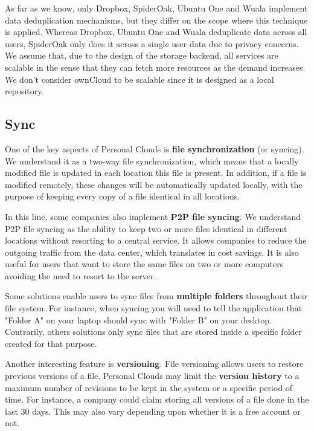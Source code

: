 As far as we know, only Dropbox, SpiderOak, Ubuntu One and Wuala implement data deduplication mechanisms, but they differ on the scope where this technique is applied. Whereas Dropbox, Ubuntu One and Wuala deduplicate data across all users, SpiderOak only does it across a single user data due to privacy concerns. We assume that, due to the design of the storage backend, all services are scalable in the sense that they can fetch more resources as the demand increases. We don't consider ownCloud to be scalable since it is designed as a local repository.

\subsection{Sync}
One of the key aspects of Personal Clouds is \textbf{file synchronization} (or syncing). We understand it as a two-way file synchronization, which means that a locally modified file is updated in each location this file is present. In addition, if a file is modified remotely, these changes will be automatically updated locally, with the purpose of keeping every copy of a file identical in all locations.

In this line, some companies also implement \textbf{P2P file syncing}. We understand P2P file syncing as the ability to keep two or more files identical in different locations without resorting to a central service. It allows companies to reduce the outgoing traffic from the data center, which translates in cost savings. It is also useful for users that want to store the same files on two or more computers avoiding the need to resort to the server.

Some solutions enable users to sync files from \textbf{multiple folders} throughout their file system. For instance, when syncing you will need to tell the application that "Folder A" on your laptop should sync with "Folder B" on your desktop. Contrarily, others solutions only sync files that are stored inside a specific folder created for that purpose.

Another interesting feature is \textbf{versioning}. File versioning allows users to restore previous versions of a file. Personal Clouds may limit the \textbf{version history} to a maximum number of revisions to be kept in the system or a specific period of time. For instance, a company could claim storing all versions of a file done in the last 30 days. This may also vary depending upon whether it is a free account or not.


